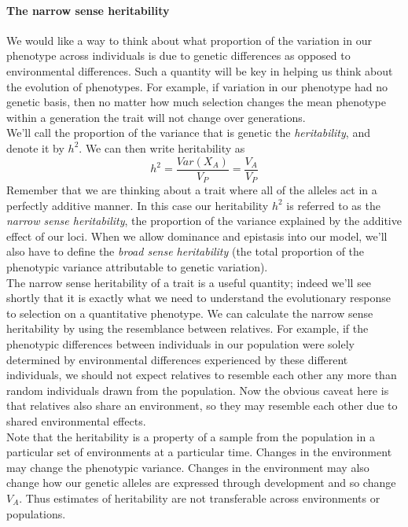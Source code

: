 \paragraph{The narrow sense heritability}
We would like a way to think about what proportion of the variation
in our phenotype across individuals is due to genetic differences as
opposed to environmental differences. Such a quantity will be key in
helping us think about the evolution of phenotypes. For example, if
variation in our phenotype had no genetic basis, then no matter how
much selection changes the mean phenotype within a generation
the trait will not change over generations. \\

We'll call the proportion of the variance that is genetic the
\textit{heritability}, and denote it by $h^2$. We can then write heritability as
\begin{equation}
h^2 = \frac{Var(X_A)}{V_P} = \frac{V_A}{V_P}
\end{equation}
Remember that we are thinking about a trait where all of the alleles act
in a perfectly additive manner. In this case our heritability $h^2$ is
referred to as the \textit{narrow sense heritability}, the proportion of the
variance explained by the additive effect of our loci.
When we allow dominance
and epistasis into our model, we'll also have to define the \textit{broad sense
heritability} (the total proportion of the phenotypic variance
attributable to genetic variation).\\

The narrow sense heritability of a trait is a useful quantity; indeed
we'll see shortly that it is exactly what we need to understand the
evolutionary response to selection on a quantitative phenotype. We can
calculate the narrow sense heritability by using the resemblance between
relatives. For example, if the phenotypic differences between individuals in our population were solely determined by environmental differences experienced by these different individuals, we
should not expect relatives to resemble each other any more than random
individuals drawn from the population. Now the obvious caveat here is
that relatives also share an environment, so they may resemble each other
due to shared environmental effects. \\

Note that the heritability is a property of a sample from the population in a particular set of environments at a particular time. Changes in the environment may change the phenotypic variance. Changes in the environment may also change how our genetic alleles are expressed through development and so change $V_A$. Thus estimates of heritability are not transferable across environments or populations. 



